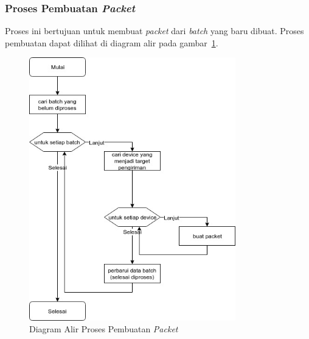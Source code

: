 \subsubsection{Proses Pembuatan \textit{Packet}}
\par Proses ini bertujuan untuk membuat \textit{packet} dari \textit{batch} yang baru dibuat.
Proses pembuatan dapat
dilihat di diagram alir pada gambar~\ref{flowchart_pembuatan_packet}.
\begin{figure}[H]
    \centering\includegraphics[width=0.8\textwidth]{bab3/figures/flowchart_pembuatan_packet.jpg}
    \caption{Diagram Alir Proses Pembuatan \textit{Packet}}
    \label{flowchart_pembuatan_packet}
\end{figure}

